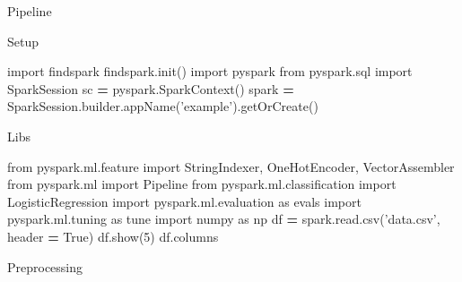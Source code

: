 \documentclass[]{book}
\newenvironment{Shaded}{\begin{snugshade}}{\end{snugshade}}
\newcommand{\DecValTok}[1]{\textcolor[rgb]{0.00,0.00,0.81}{#1}}
\newcommand{\StringTok}[1]{\textcolor[rgb]{0.31,0.60,0.02}{#1}}
\newcommand{\ImportTok}[1]{#1}
\newcommand{\VariableTok}[1]{\textcolor[rgb]{0.00,0.00,0.00}{#1}}
\newcommand{\OperatorTok}[1]{\textcolor[rgb]{0.81,0.36,0.00}{\textbf{#1}}}
\newcommand{\NormalTok}[1]{#1}
\theoremstyle{definition}
\theoremstyle{definition}
\theoremstyle{definition}
\theoremstyle{remark}
\begin{document}
Pipeline

Setup

\begin{Shaded}
\begin{Highlighting}[]
\ImportTok{import}\NormalTok{ findspark}
\NormalTok{findspark.init()}
\ImportTok{import}\NormalTok{ pyspark}
\ImportTok{from}\NormalTok{ pyspark.sql }\ImportTok{import}\NormalTok{ SparkSession}
\NormalTok{sc }\OperatorTok{=}\NormalTok{ pyspark.SparkContext()}
\NormalTok{spark }\OperatorTok{=}\NormalTok{ SparkSession.builder.appName(}\StringTok{'example'}\NormalTok{).getOrCreate()}
\end{Highlighting}
\end{Shaded}

Libs

\begin{Shaded}
\begin{Highlighting}[]
\ImportTok{from}\NormalTok{ pyspark.ml.feature }\ImportTok{import}\NormalTok{ StringIndexer, OneHotEncoder, VectorAssembler}
\ImportTok{from}\NormalTok{ pyspark.ml }\ImportTok{import}\NormalTok{ Pipeline}
\ImportTok{from}\NormalTok{ pyspark.ml.classification }\ImportTok{import}\NormalTok{ LogisticRegression}
\ImportTok{import}\NormalTok{ pyspark.ml.evaluation }\ImportTok{as}\NormalTok{ evals}
\ImportTok{import}\NormalTok{ pyspark.ml.tuning }\ImportTok{as}\NormalTok{ tune}
\ImportTok{import}\NormalTok{ numpy }\ImportTok{as}\NormalTok{ np}
\NormalTok{df }\OperatorTok{=}\NormalTok{ spark.read.csv(}\StringTok{'data.csv'}\NormalTok{, header }\OperatorTok{=} \VariableTok{True}\NormalTok{)}
\NormalTok{df.show(}\DecValTok{5}\NormalTok{)}
\NormalTok{df.columns}
\end{Highlighting}
\end{Shaded}

Preprocessing
\end{document}
